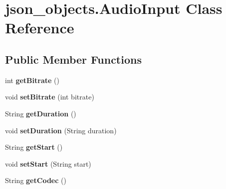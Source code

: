 \hypertarget{classjson__objects_1_1_audio_input}{
\section{json\_\-objects.AudioInput Class Reference}
\label{classjson__objects_1_1_audio_input}
}
\subsection*{Public Member Functions}
\begin{DoxyCompactItemize}
\item 
\hypertarget{classjson__objects_1_1_audio_input_a2a0f0fe2b472508ed42e1cadac3ddd14}{
int {\bfseries getBitrate} ()}
\label{classjson__objects_1_1_audio_input_a2a0f0fe2b472508ed42e1cadac3ddd14}

\item 
\hypertarget{classjson__objects_1_1_audio_input_ade6e75aca3eaebccbf67c2a84f2b48b7}{
void {\bfseries setBitrate} (int bitrate)}
\label{classjson__objects_1_1_audio_input_ade6e75aca3eaebccbf67c2a84f2b48b7}

\item 
\hypertarget{classjson__objects_1_1_audio_input_a28a84de904d99891572591143feaecec}{
String {\bfseries getDuration} ()}
\label{classjson__objects_1_1_audio_input_a28a84de904d99891572591143feaecec}

\item 
\hypertarget{classjson__objects_1_1_audio_input_a0494b04c627754ca52adefc69e68d27e}{
void {\bfseries setDuration} (String duration)}
\label{classjson__objects_1_1_audio_input_a0494b04c627754ca52adefc69e68d27e}

\item 
\hypertarget{classjson__objects_1_1_audio_input_a1d158ec16060fb89e3e7a8ddbb4eb859}{
String {\bfseries getStart} ()}
\label{classjson__objects_1_1_audio_input_a1d158ec16060fb89e3e7a8ddbb4eb859}

\item 
\hypertarget{classjson__objects_1_1_audio_input_ad2ef0629542b331e63f65f0ea6c87fc1}{
void {\bfseries setStart} (String start)}
\label{classjson__objects_1_1_audio_input_ad2ef0629542b331e63f65f0ea6c87fc1}

\item 
\hypertarget{classjson__objects_1_1_audio_input_a1d463b073094099b092d3b0e25aae866}{
String {\bfseries getCodec} ()}
\label{classjson__objects_1_1_audio_input_a1d463b073094099b092d3b0e25aae866}


\end{DoxyCompactItemize}
